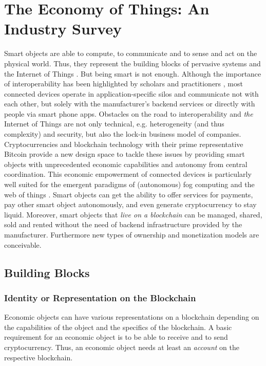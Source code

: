 \chapter{The Economy of Things: An Industry Survey}
\label{sec:economy}

Smart objects are able to compute, to communicate and to sense and act on the physical world. Thus, they represent the building blocks of pervasive systems and the Internet of Things \cite{kortuem2010smart}. But being smart is not enough. Although the importance of interoperability has been highlighted by scholars \cite{zorzi2010} and practitioners \cite{manyika2015unlocking}, most connected devices operate in application-specific silos and communicate not with each other, but solely with the manufacturer's backend services or directly with people via smart phone apps.
Obstacles on the road to interoperability and \textit{the} Internet of Things are not only technical, e.g. heterogeneity (and thus complexity) and security, but also the lock-in business model of companies.
Cryptocurrencies and blockchain technology with their prime representative Bitcoin provide a new design space to tackle these issues by providing smart objects with unprecedented economic capabilities and autonomy from central coordination. This economic empowerment of connected devices is particularly well suited for the emergent paradigms of (autonomous) fog computing \cite{Bonomi:2012:FCR:2342509.2342513} and the web of things . Smart objects can get the ability to offer services for payments, pay other smart object autonomously, and even generate cryptocurrency to stay liquid. Moreover, smart objects that \textit{live on a blockchain} can be managed, shared, sold and rented without the need of backend infrastructure provided by the manufacturer. Furthermore new types of ownership and monetization models are conceivable.


\section{Building Blocks}

\subsection{Identity or Representation on the Blockchain}

Economic objects can have various representations on a blockchain depending on the capabilities of the object and the specifics of the blockchain. A basic requirement for an economic object is to be able to receive and to send cryptocurrency. Thus, an economic object needs at least an \emph{account} on the respective blockchain.

